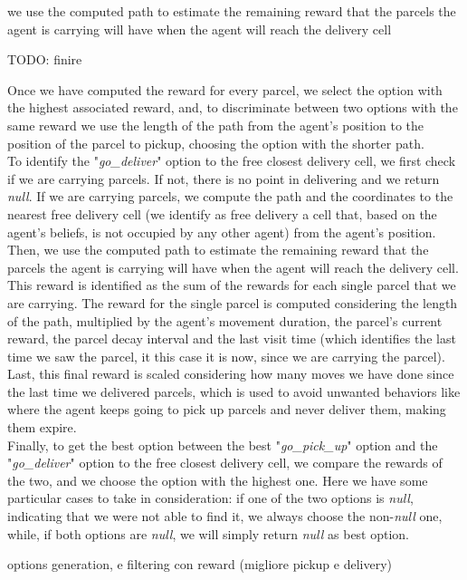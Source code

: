         we use the computed path to estimate the remaining reward that the parcels the agent is carrying will have when the agent will reach the delivery cell
        
        TODO: finire 

        Once we have computed the reward for every parcel, we select the option with the highest associated reward, and, to discriminate between two options with the same reward we use the length of the path from the agent's position to the position of the parcel to pickup, choosing the option with the shorter path.
        \medskip\\
        To identify the "\textit{go\_deliver}" option to the free closest delivery cell, we first check if we are carrying parcels. If not, there is no point in delivering and we return \textit{null}. If we are carrying parcels, we compute the path and the coordinates to the nearest free  delivery cell (we identify as free delivery a cell that, based on the agent's beliefs, is not occupied by any other agent) from the agent's position. Then, we use the computed path to estimate the remaining reward that the parcels the agent is carrying will have when the agent will reach the delivery cell. This reward is identified as the sum of the rewards for each single parcel that we are carrying. The reward for the single parcel is computed considering the length of the path, multiplied by the agent's movement duration, the parcel's current reward, the parcel decay interval and the last visit time (which identifies the last time we saw the parcel, it this case it is now, since we are carrying the parcel). Last, this final reward is scaled considering how many moves we have done since the last time we delivered parcels, which is used to avoid unwanted behaviors like where the agent keeps going to pick up parcels and never deliver them, making them expire.
        \medskip\\
        Finally, to get the best option between the best "\textit{go\_pick\_up}" option and the "\textit{go\_deliver}" option to the free closest delivery cell, we compare the rewards of the two, and we choose the option with the highest one. Here we have some particular cases to take in consideration: if one of the two options is \textit{null}, indicating that we were not able to find it, we always choose the non-\textit{null} one, while, if both options are \textit{null}, we will simply return \textit{null} as best option.

        options generation, e filtering con reward (migliore pickup e delivery)

